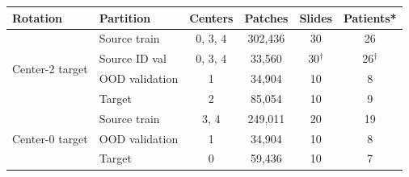\footnotesize
\setlength{\tabcolsep}{2.5pt}
\begin{tabular}{llcccc}
\toprule
Rotation & Partition & Centers & Patches & Slides & Patients* \\
\midrule
\multirow{4}{*}{Center-2 target} & Source train & 0, 3, 4 & 302{,}436 & 30 & 26 \\
 & Source ID val & 0, 3, 4 & 33{,}560 & 30$^\dagger$ & 26$^\dagger$ \\
 & OOD validation & 1 & 34{,}904 & 10 & 8 \\
 & Target & 2 & 85{,}054 & 10 & 9 \\
\midrule
\multirow{3}{*}{Center-0 target} & Source train & 3, 4 & 249{,}011 & 20 & 19 \\
 & OOD validation & 1 & 34{,}904 & 10 & 8 \\
 & Target & 0 & 59{,}436 & 10 & 7 \\
\bottomrule
\end{tabular}
